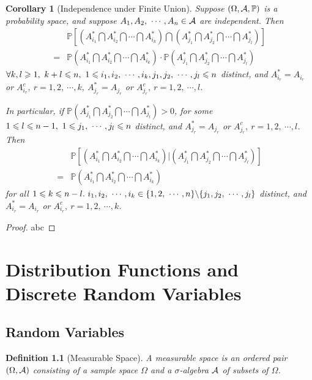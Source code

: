 \documentclass[openany,12pt]{book}
\newtheorem{corollary}{Corollary}[chapter]
\newtheorem{definition}{Definition}[chapter]
\begin{document}
\begin{corollary}[Independence under Finite Union]
Suppose $(\Omega,\mathcal{A},\mathbb{P})$ is a probability space, and suppose $A_1,A_2,\ \cdots,A_n\in\ma$ are independent. Then
$$\begin{aligned}
&\mathbb{P}\left[\left(A_{i_1}^* \bigcap A_{i_2}^*\bigcap\cdots\bigcap A_{i_k}^*\right)\bigcap\left(A_{j_1}^* \bigcap A_{j_2}^*\bigcap\cdots\bigcap A_{j_l}^* \right)\right] \\
=&\mathbb{P}\left(A_{i_1}^*\bigcap A_{i_2}^*\bigcap\cdots\bigcap A_{i_k}^*\right)\cdot \mathbb{P}\left(A_{j_1}^*\bigcap A_{j_2}^*\bigcap\cdots\bigcap A_{j_l}^*\right)
\end{aligned}$$
 $\forall k,l\gs1,\ k+l\ls n,\ 1\ls i_1,i_2,\ \cdots,i_k,j_1,j_2,\ \cdots,j_l\ls n$ distinct, and $A_{i_r}^*=A_{i_r}$ or $A_{i_r}^c,\ r=1,2,\ \cdots,k,\ A_{j_r}^*=A_{j_r}$ or $A_{j_r}^c,\ r=1,2,\ \cdots,l.$

In particular, if $\mathbb{P}\left(A_{j_1}^* \bigcap A_{j_2}^* \bigcap\cdots\bigcap A_{j_l}^*\right)>0$, for some $1\ls l\ls n-1,\ 1\ls j_1,\ \cdots,j_l\ls n$ distinct, and $A_{j_r}^*=A_{j_r}$ or $A_{j_r}^c,\ r=1,2,\ \cdots,l$. Then 
$$\begin{aligned}
&\mathbb{P}\left[\left(A_{i_1}^*\bigcap A_{i_2}^*\bigcap\cdots\bigcap A_{i_k}^*\right)\bigg|\left(A_{j_1}^*\bigcap A_{j_2}^*\bigcap\cdots\bigcap A_{j_l}^*\right)\right]\\
=&\mathbb{P}\left(A_{i_1}^*\bigcap A_{i_2}^*\bigcap\cdots\bigcap A_{i_k}^*\right)\end{aligned}$$
 for all $1\ls k\ls n-l.\ i_1,i_2,\ \cdots,i_k\in\{1,2,\ \cdots,n\}\backslash\{j_1,j_2,\ \cdots,j_l \}$ distinct, and $A_{i_r}^*=A_{i_r }$ or $A_{i_r}^c, \ r=1,2,\ \cdots,k$.
\end{corollary}

\begin{proof}
  abc
\end{proof}

\chapter{Distribution Functions and Discrete Random Variables}

\section{Random Variables}

\begin{definition}[Measurable Space]
A measurable space is an ordered pair $(\Omega,\mathcal{A})$ consisting of a sample space $\Omega$ and a $\sigma$-algebra $\mathcal{A}$ of subsets of $\Omega$.
\end{definition}
\end{document}
